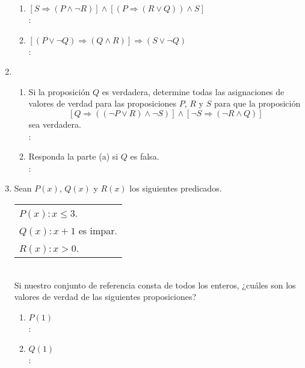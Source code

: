 \begin{enumerate}[label=0.1.\arabic*]
\begin{enumerate}[label=\arabic*)]
		\item $ [S \Rightarrow (P \wedge \neg R)] \wedge [( P \Rightarrow (R \vee Q) ) \wedge S] $ \\
		\solucion: \\
		
		\item $ [(P \vee \neg Q) \Rightarrow (Q \wedge R)] \Rightarrow (S \vee \neg Q) $ \\
		\solucion: \\
		
	\end{enumerate}

	\item
	\begin{enumerate}[label=\alph*)]
		\item Si la proposición $ Q $ es verdadera, determine todas las asignaciones de valores de verdad para las proposiciones $ P $, $ R $ y $ S $ para que la proposición
		\[ [Q \Rightarrow ((\neg P \vee R) \wedge \neg S)] \wedge [\neg S \Rightarrow (\neg R \wedge Q)] \]
		sea verdadera. \\
		\solucion: \\
		
		\item Responda la parte (a) si $ Q $ es falsa. \\
		\solucion: \\
		
	\end{enumerate}

	\item Sean $ P(x) $, $ Q(x) $ y $ R(x) $ los siguientes predicados. \\
	\begin{tabular}{l}
		$ P(x): x \leq 3 $. \\
		$ Q(x): x + 1 $ es impar. \\
		$ R(x): x > 0 $.
	\end{tabular} \\
	Si nuestro conjunto de referencia consta de todos los enteros, ¿cuáles son los valores de verdad de las siguientes proposiciones?
	\begin{enumerate}[label=\arabic*)]
		\item $ P(1) $ \\
		\solucion: \\
		
		\item $ Q(1) $ \\
		\solucion: \\
		

\end{enumerate}
\end{enumerate}
